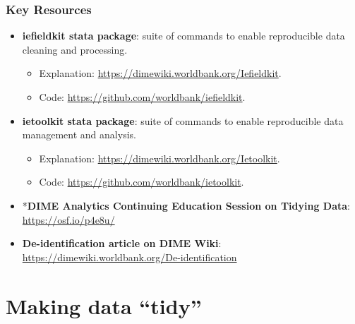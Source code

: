 \documentclass[
]{book}
\providecommand{\tightlist}{%
  \setlength{\itemsep}{0pt}\setlength{\parskip}{0pt}}
\begin{document}
\begin{summary}
\hypertarget{key-resources-4}{%
\subsubsection*{Key Resources}\label{key-resources-4}}

\begin{itemize}
\tightlist
\item
  \textbf{iefieldkit stata package}: suite of commands to enable reproducible data cleaning and processing.

  \begin{itemize}
  \tightlist
  \item
    Explanation: \url{https://dimewiki.worldbank.org/Iefieldkit}.
  \item
    Code: \url{https://github.com/worldbank/iefieldkit}.
  \end{itemize}
\item
  \textbf{ietoolkit stata package}: suite of commands to enable reproducible data management and analysis.

  \begin{itemize}
  \tightlist
  \item
    Explanation: \url{https://dimewiki.worldbank.org/Ietoolkit}.
  \item
    Code: \url{https://github.com/worldbank/ietoolkit}.
  \end{itemize}
\item
  *\textbf{DIME Analytics Continuing Education Session on Tidying Data}: \url{https://osf.io/p4e8u/}
\item
  \textbf{De-identification article on DIME Wiki}: \url{https://dimewiki.worldbank.org/De-identification}
\end{itemize}
\end{summary}

\hypertarget{making-data-tidy}{%
\section*{Making data ``tidy''}\label{making-data-tidy}}
\end{document}
